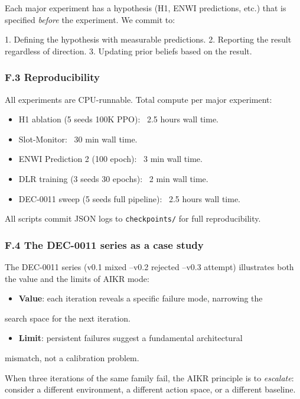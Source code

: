 \documentclass[11pt]{article}
\begin{document}
Each major experiment has a hypothesis (H1, ENWI predictions, etc.) that
is specified \textit{before} the experiment. We commit to:

1. Defining the hypothesis with measurable predictions.
2. Reporting the result regardless of direction.
3. Updating prior beliefs based on the result.

\subsubsection{F.3 Reproducibility}

All experiments are CPU-runnable. Total compute per major experiment:

\begin{itemize}
  \item H1 ablation (5 seeds  100K PPO): ~2.5 hours wall time.
  \item Slot-Monitor: ~30 min wall time.
  \item ENWI Prediction 2 (100 epoch): ~3 min wall time.
  \item DLR training (3 seeds  30 epochs): ~2 min wall time.
  \item DEC-0011 sweep (5 seeds  full pipeline): ~2.5 hours wall time.
\end{itemize}


All scripts commit JSON logs to \texttt{checkpoints/} for full reproducibility.

\subsubsection{F.4 The DEC-0011 series as a case study}

The DEC-0011 series (v0.1 mixed --v0.2 rejected --v0.3 attempt) illustrates
both the value and the limits of AIKR mode:

\begin{itemize}
  \item \textbf{Value}: each iteration reveals a specific failure mode, narrowing the
\end{itemize}

  search space for the next iteration.
\begin{itemize}
  \item \textbf{Limit}: persistent failures suggest a fundamental architectural
\end{itemize}

  mismatch, not a calibration problem.

When three iterations of the same family fail, the AIKR principle is to
\textit{escalate}: consider a different environment, a different action space,
or a different baseline.
\end{document}
